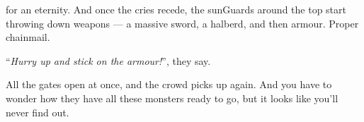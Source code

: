 for an eternity.
And once the cries recede, the \glspl{sunGuard} around the top start throwing down weapons --- a massive sword, a halberd, and then armour.
Proper chainmail.

``\textit{Hurry up and stick on the armour!}'', they say.

All the gates open at once, and the crowd picks up again.
And you have to wonder how they have all these \glspl{monster} ready to go, but it looks like you'll never find out.


